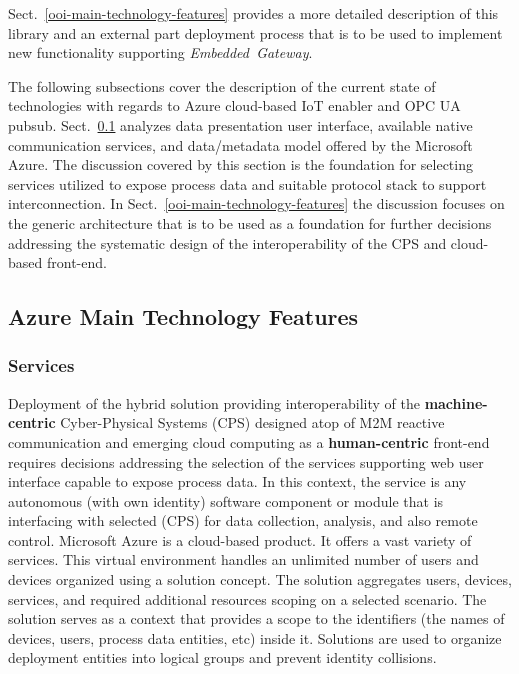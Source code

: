 \documentclass{jacsart}
\begin{document}
Sect.~\ref*{ooi-main-technology-features} provides a more detailed description of this library and an external part deployment process that is to be used to implement new functionality supporting \textit{Embedded\ Gateway}.

The following subsections cover the description of the current state of technologies with regards to Azure cloud-based IoT enabler and OPC UA pubsub. Sect.~\ref*{azure-main-technology-features} analyzes data presentation user interface, available native communication services, and data/metadata model offered by the Microsoft Azure. The discussion covered by this section is the foundation for selecting services utilized to expose process data and suitable protocol stack to support interconnection. In Sect.~\ref*{ooi-main-technology-features} the discussion focuses on the generic architecture that is to be used as a foundation for further decisions addressing the systematic design of the interoperability of the CPS and cloud-based front-end.

\subsection{Azure Main Technology Features}\label{azure-main-technology-features}

\subsubsection{Services}\label{services}

Deployment of the hybrid solution providing interoperability of the \textbf{machine-centric} Cyber-Physical Systems (CPS) designed atop of M2M reactive communication and emerging cloud computing as a \textbf{human-centric} front-end requires decisions addressing the selection of the services supporting web user interface capable to expose process data. In this context, the service is any autonomous (with own identity) software component or module that is interfacing with selected (CPS) for data collection, analysis, and also remote control. Microsoft Azure is a cloud-based product. It offers a vast variety of services. This virtual environment handles an unlimited number of users and devices organized using a solution concept. The solution aggregates users, devices, services, and required additional resources scoping on a selected scenario. The solution serves as a context that provides a scope to the identifiers (the names of devices, users, process data entities, etc) inside it. Solutions are used to organize deployment entities into logical groups and prevent identity collisions.
\end{document}
